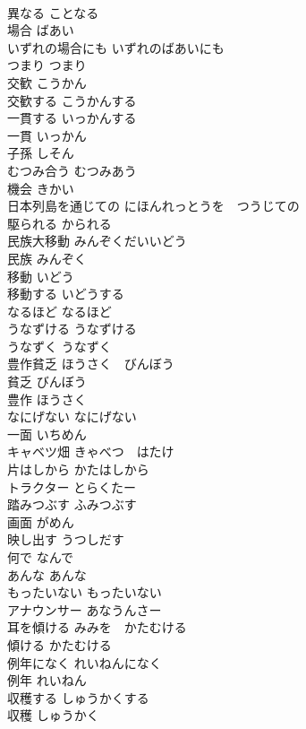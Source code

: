 \documentclass[8pt]{extreport}
\begin{document}
\begin{CJK}{UTF8}{min}
\\	異なる	ことなる	
\\	場合	ばあい	
\\	いずれの場合にも	いずれのばあいにも	
\\	つまり	つまり	
\\	交歓	こうかん	
\\	交歓する	こうかんする	
\\	一貫する	いっかんする	
\\	一貫	いっかん	
\\	子孫	しそん	
\\	むつみ合う	むつみあう	
\\	機会	きかい	
\\	日本列島を通じての	にほんれっとうを　つうじての	
\\	駆られる	かられる	
\\	民族大移動	みんぞくだいいどう	
\\	民族	みんぞく	
\\	移動	いどう	
\\	移動する	いどうする	
\\	なるほど	なるほど	
\\	うなずける	うなずける	
\\	うなずく	うなずく	
\\	豊作貧乏	ほうさく　びんぼう	
\\	貧乏	びんぼう	
\\	豊作	ほうさく	
\\	なにげない	なにげない	
\\	一面	いちめん	
\\	キャベツ畑	きゃべつ　はたけ	
\\	片はしから	かたはしから	
\\	トラクター	とらくたー	
\\	踏みつぶす	ふみつぶす	
\\	画面	がめん	
\\	映し出す	うつしだす	
\\	何で	なんで	
\\	あんな	あんな	
\\	もったいない	もったいない	
\\	アナウンサー	あなうんさー	
\\	耳を傾ける	みみを　かたむける	
\\	傾ける	かたむける	
\\	例年になく	れいねんになく	
\\	例年	れいねん	
\\	収穫する	しゅうかくする	
\\	収穫	しゅうかく	

\end{CJK}
\end{document}
